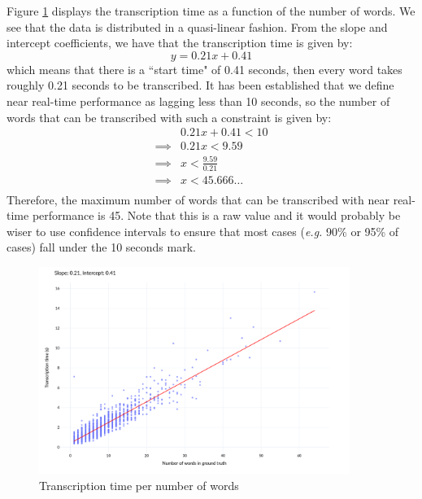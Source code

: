 \documentclass[12pt]{article}
\begin{document}
Figure \ref{fig: transcription_time} displays the transcription time as a function of the number of words. We see that the data is distributed in a quasi-linear fashion. From the slope and intercept coefficients, we have that the transcription time is given by:
\begin{equation}
    \label{eqn: transcription time per number of words}
    y = 0.21 x + 0.41
\end{equation}
which means that there is a ``start time" of 0.41 seconds, then every word takes roughly 0.21 seconds to be transcribed. It has been established that we define near real-time performance as lagging less than 10 seconds, so the number of words that can be transcribed with such a constraint is given by:
\begin{align*}
             & 0.21 x + 0.41 < 10 \\
    \implies &
    0.21 x < 9.59                 \\
    \implies &
    x < \frac{9.59}{0.21}         \\
    \implies &
    x < 45.666\ldots              \\
\end{align*}
Therefore, the maximum number of words that can be transcribed with near real-time performance is 45. Note that this is a raw value and it would probably be wiser to use confidence intervals to ensure that most cases (\textit{e.g.} 90\% or 95\% of cases) fall under the 10 seconds mark.
\begin{figure}
    \centering
    \includegraphics[width=0.9\textwidth]{images/transcription_time.png}
    \caption{Transcription time per number of words}
    \label{fig: transcription_time}
\end{figure}
\end{document}
